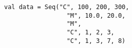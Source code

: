 \begin{lstlisting}[style=scalaioScala]
val data = Seq("C", 100, 200, 300,
                 "M", 10.0, 20.0,
                 "M",
                 "C", 1, 2, 3,
                 "C", 1, 3, 7, 8)
\end{lstlisting}
